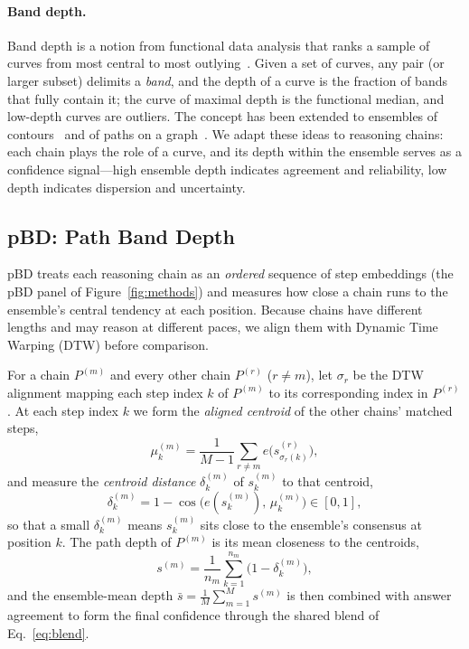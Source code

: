\documentclass[twoside]{article}
\begin{document}
\paragraph{Band depth.}
Band depth is a notion from functional data analysis that ranks a sample of
curves from most central to most outlying~\citep{lopezpintado2009banddepth}.
Given a set of curves, any pair (or larger subset) delimits a \emph{band}, and
the depth of a curve is the fraction of bands that fully contain it; the curve of
maximal depth is the functional median, and low-depth curves are outliers. The
concept has been extended to ensembles of contours~\citep{santer2023contourbanddepth}
and of paths on a graph~\citep{raj2017pathboxplots}. We adapt these ideas to
reasoning chains: each chain plays the role of a curve, and its depth within the
ensemble serves as a confidence signal---high ensemble depth indicates agreement
and reliability, low depth indicates dispersion and uncertainty.



\subsection{pBD: Path Band Depth}
\label{sec:method:pbd}

pBD treats each reasoning chain as an \emph{ordered} sequence of step embeddings
(the pBD panel of Figure~\ref{fig:methods}) and measures how close a chain runs
to the ensemble's central tendency at each position. Because chains have
different lengths and may reason at different
paces, we align them with Dynamic Time Warping (DTW) before comparison.

For a chain $P^{(m)}$ and every other chain $P^{(r)}$ ($r \neq m$), let
$\sigma_r$ be the DTW alignment mapping each step index $k$ of $P^{(m)}$ to its
corresponding index in $P^{(r)}$. At each step index $k$ we form the
\emph{aligned centroid} of the other chains' matched steps,
\begin{equation}
  \mu_k^{(m)} = \frac{1}{M-1} \sum_{r \neq m} e\big(s_{\sigma_r(k)}^{(r)}\big),
\end{equation}
and measure the \emph{centroid distance} $\delta_k^{(m)}$ of $s_k^{(m)}$ to that
centroid,
\begin{equation}
  \delta_k^{(m)} = 1 - \cos\!\big( e(s_k^{(m)}),\, \mu_k^{(m)} \big) \in [0, 1],
\end{equation}
so that a small $\delta_k^{(m)}$ means $s_k^{(m)}$ sits close to the ensemble's
consensus at position $k$. The path depth of $P^{(m)}$ is its mean closeness to
the centroids,
\begin{equation}
  s^{(m)} = \frac{1}{n_m} \sum_{k=1}^{n_m} \big( 1 - \delta_k^{(m)} \big),
\end{equation}
and the ensemble-mean depth $\bar{s} = \frac{1}{M} \sum_{m=1}^{M} s^{(m)}$ is
then combined with answer agreement to form the final confidence through the
shared blend of Eq.~\eqref{eq:blend}.
\end{document}
